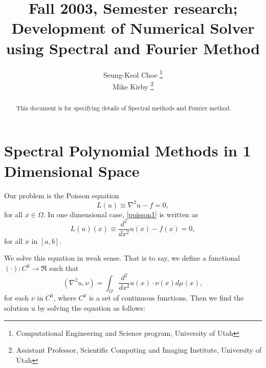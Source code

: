 \documentclass[11pt,letterpaper]{article}
\begin{document}
\title{{\normalsize Fall 2003, Semester research;}\\
        {\bfseries Development of Numerical Solver using Spectral and Fourier Method}
}

\vfill
\author{Seung-Keol Choe \thanks{Computational Engineering and Science program, University of Utah}\\
        Mike Kirby \thanks{Assistant Professor, Scientific Computing and Imaging Institute, University of Utah}
       }

\renewcommand{\today}{Aug 28th, 2003}

\maketitle

\begin{abstract}
This document is for specifying details of Spectral methods and
Fourier method.
\end{abstract}

\tableofcontents

\clearpage



\clearpage
%
\section {Spectral Polynomial Methods in 1 Dimensional Space}

Our problem is the Poisson equation
\begin{equation}
\label{poisson1} L(u) \equiv  \nabla^2 u - f = 0,
\end{equation}
for all $x \in \Omega$. In one dimensional case, \ref{poisson1} is
written as
\begin{equation}
\label{poisson2}
L(u)(x) \equiv \frac{d^2}{dx^2} u(x) - f(x) = 0,
\end{equation}
for all $x$ in $[a, b]$.

We solve this equation in weak sense. That is to say, we define a
functional $\left( \cdot \right) : C^0 \rightarrow \Re$ such that
\begin{equation}
\left(\nabla^2 u, \nu \right) = \int_{\Omega} \frac{d^2}{dx^2}
u(x) \cdot \nu(x) d\mu(x),
\end{equation}
for each $\nu$ in $C^0$, where $C^0$ is a set of continuous
functions. Then we find the solution u by solving the equation as
follows:
\end{document}
